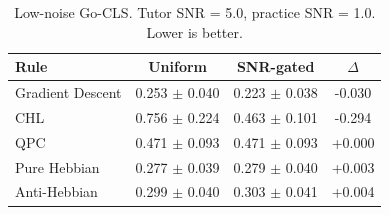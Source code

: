 \begin{table}[H]
\centering
\caption{Low-noise Go-CLS. Tutor SNR = 5.0, practice SNR = 1.0. Lower is better.}
\label{tab:go_cls_snr_lownoise}
\begin{tabular}{lccc}
\toprule
\textbf{Rule} & \textbf{Uniform} & \textbf{SNR-gated} & \textbf{$\Delta$} \\
\midrule
Gradient Descent & 0.253 $\pm$ 0.040 & 0.223 $\pm$ 0.038 & -0.030 \\
CHL & 0.756 $\pm$ 0.224 & 0.463 $\pm$ 0.101 & -0.294 \\
QPC & 0.471 $\pm$ 0.093 & 0.471 $\pm$ 0.093 & +0.000 \\
Pure Hebbian & 0.277 $\pm$ 0.039 & 0.279 $\pm$ 0.040 & +0.003 \\
Anti-Hebbian & 0.299 $\pm$ 0.040 & 0.303 $\pm$ 0.041 & +0.004 \\
\bottomrule
\end{tabular}
\end{table}